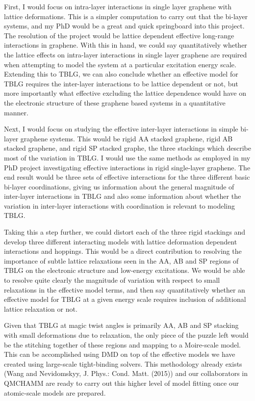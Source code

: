 \documentclass{article}
\begin{document}
First, I would focus on intra-layer interactions in single layer graphene with lattice deformations.
This is a simpler computation to carry out that the bi-layer systems, and my PhD would be a great and quick springboard into this project.
The resolution of the project would be lattice dependent effective long-range interactions in graphene.
With this in hand, we could say quantitatively whether the lattice effects on intra-layer interactions in single layer graphene are required when attempting to model the system at a particular excitation energy scale.
Extending this to TBLG, we can also conclude whether an effective model for TBLG requires the inter-layer interactions to be lattice dependent or not, but more importantly what effective excluding the lattice dependence would have on the electronic structure of these graphene based systems in a quantitative manner.

Next, I would focus on studying the effective inter-layer interactions in simple bi-layer graphene systems.
This would be rigid AA stacked graphene,  rigid AB stacked graphene, and rigid SP stacked graphe, the three stackings which describe most of the variation in TBLG.
I would use the same methods as employed in my PhD project investigating effective interactions in rigid single-layer graphene.
The end result would be three sets of effective interactions for the three different basic bi-layer coordinations, giving us information about the general magnitude of inter-layer interactions in TBLG and also some information about whether the variation in inter-layer interactions with coordination is relevant to modeling TBLG.

Taking this a step further, we could distort each of the three rigid stackings and develop three different interacting models with lattice deformation dependent interactions and hoppings.
This would be a direct contribution to resolving the importance of subtle lattice relaxations seen in the AA, AB and SP regions of TBLG on the electronic structure and low-energy excitations.
We would be able to resolve quite clearly the magnitude of variation with respect to small relaxations in the effective model terms, and then say quantitatively whether an effective model for TBLG at a given energy scale requires inclusion of additional lattice relaxation or not.

Given that TBLG at magic twist angles is primarily AA, AB and SP stacking with small deformations due to relaxation, the only piece of the puzzle left would be the stitching together of these regions and mapping to a Moire-scale model.
This can be accomplished using DMD on top of the effective models we have created using large-scale tight-binding solvers.
This methodology already exists (Wang and Nevidomskyy, J. Phys.: Cond. Matt.  (2015)) and our collaborators in QMCHAMM are ready to carry out this higher level of model fitting once our atomic-scale models are prepared.
\end{document}
